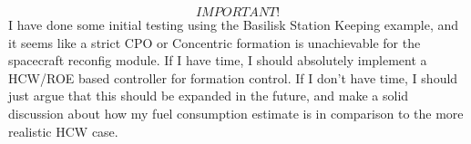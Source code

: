 
\[IMPORTANT!\]
I have done some initial testing using the Basilisk Station Keeping example, and it seems like a strict CPO or Concentric formation is unachievable for the spacecraft reconfig module. If I have time, I should absolutely implement a HCW/ROE based controller for formation control. If I don't have time, I should just argue that this should be expanded in the future, and make a solid discussion about how my fuel consumption estimate is in comparison to the more realistic HCW case. 